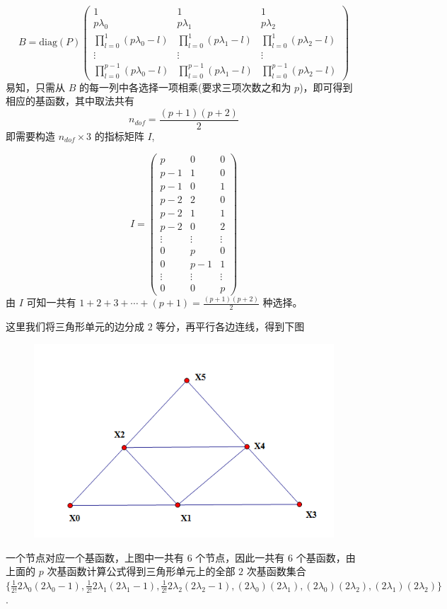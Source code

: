 \documentclass[12pt,a4paper]{article}
\begin{document}
$$
B = \mathrm{diag}(P)
\begin{pmatrix}
1 & 1 & 1 \\
p\lambda_0 & p\lambda_1 & p\lambda_2\\
\prod_{l=0}^{1}(p\lambda_0 - l) & \prod_{l=0}^{1}(p\lambda_1 - l)
& \prod_{l=0}^{1}(p\lambda_2 - l) \\
\vdots & \vdots & \vdots \\
\prod_{l=0}^{p-1}(p\lambda_0 - l) & \prod_{l=0}^{p-1}(p\lambda_1 - l)
& \prod_{l=0}^{p-1}(p\lambda_2 - l) 
\end{pmatrix}
$$
易知，只需从 $B$ 的每一列中各选择一项相乘(要求三项次数之和为 $p$)，即可得到相应的基函数，其中取法共有 
$$
n_{dof} = \frac{(p+1)(p+2)}{2}
$$
即需要构造 $n_{dof}\times 3$ 的指标矩阵 $I$, 

$$
I = \begin{pmatrix}
p & 0 & 0 \\
p-1 & 1 & 0 \\
p-1 & 0 & 1 \\
p-2 & 2 & 0 \\
p-2 & 1 & 1 \\
p-2 & 0 & 2 \\
\vdots & \vdots & \vdots \\
0   & p & 0 \\
0   & p-1 & 1\\
\vdots & \vdots & \vdots \\
0   & 0  & p
\end{pmatrix}
$$
由 $I$ 可知一共有 $1+2+3+\cdots+(p+1)=\frac{(p+1)(p+2)}{2}$ 种选择。

这里我们将三角形单元的边分成 $2$ 等分，再平行各边连线，得到下图
\begin{figure}[H]
\centering
\includegraphics[scale=0.7]{./figures/9.png}
\caption{}
\end{figure}
一个节点对应一个基函数，上图中一共有 $6$ 个节点，因此一共有 $6$ 个基函数，由上面的 $p$ 次基函数计算公式得到三角形单元上的全部 $2$ 次基函数集合$\lbrace \frac{1}{2!}2\lambda_0 (2\lambda_0 -1),\frac{1}{2!}2\lambda_1 (2\lambda_1 -1),\frac{1}{2!}2\lambda_2 (2\lambda_2 -1),(2\lambda_0)(2\lambda_1),(2\lambda_0)(2\lambda_2),(2\lambda_1)(2\lambda_2)\rbrace $.
\end{document}
